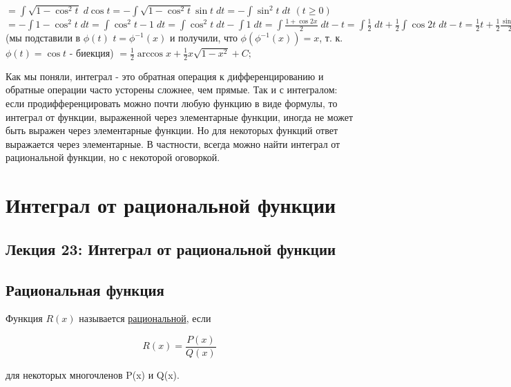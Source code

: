 \begin{example}
\begin{enumerate}
    	$= \displaystyle\int \sqrt{1 - \cos^2{t}} \; d\cos{t} = -\displaystyle\int \sqrt{1 - \cos^2{t}} \sin{t} \; dt = -\displaystyle\int \sin^2{t} \; dt$ $(t \geqslant 0)$ $= -\displaystyle\int 1 - \cos^2{t} \; dt = \displaystyle\int \cos^2{t} - 1 \; dt = \displaystyle\int \cos^2{t} \; dt - \displaystyle\int 1 \; dt = \displaystyle\int \frac{1 + \cos{2x}}{2} \; dt - t = \displaystyle\int \frac{1}{2} \; dt + \frac{1}{2} \displaystyle\int \cos{2t} \; dt - t = \frac{1}{2}t + \frac{1}{2}\frac{\sin{2t}}{2} + C = \frac{1}{2}t + \frac{1}{2}\sin{t}\cos{t} + C = \frac{1}{2}\arccos{x} + \frac{1}{2}\cos{(\arccos{x})}\sin{(\arccos{x})} + C$ (мы подставили в $\phi(t)$ $t = \phi^{-1}(x)$ и получили, что $\phi(\phi^{-1}(x)) = x$, т. к. $\phi(t) = \cos{t}$ - биекция) $= \frac{1}{2}\arccos{x} + \frac{1}{2}x\sqrt{1 - x^2} + C;$
    	
    \end{enumerate}
    \end{example}
      
    Как мы поняли, интеграл - это обратная операция к дифференцированию и обратные операции часто усторены сложнее, чем прямые. Так и с интегралом: если продифференцировать можно почти любую функцию в виде формулы, то интеграл от функции, выраженной через элементарные функции, иногда не может быть выражен через элементарные функции. Но для некоторых функций ответ выражается через элементарные. В частности, всегда можно найти интеграл от рациональной функции, но с некоторой оговоркой.
	
	\chapter{Интеграл от рациональной функции}
	
	\section*{Лекция 23: Интеграл от рациональной функции}
	
	\section{Рациональная функция}
	
	\begin{definition}
		Функция $R(x)$ называется \underline{рациональной}, если 
		
		\[R(x) = \frac{P(x)}{Q(x)}\]
		
		для некоторых многочленов P(x) и Q(x).
	\end{definition}
	
